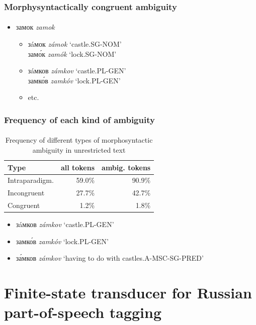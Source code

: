 \documentclass{beamer}
\newcommand{\rus}[1]{\foreignlanguage{russian}{#1}}
\begin{document}
\begin{frame}
\frametitle{Morphysyntactically congruent ambiguity}
\framesubtitle{}
\begin{itemize}
	\item \rus{замок} \emph{zamok}
	\begin{itemize}
		\item \rus{з\'{a}мок} \emph{z\'{a}mok} `castle.SG-NOM'\\
			  \rus{зам\'{о}к} \emph{zam\'{o}k} `lock.SG-NOM'
		\item \rus{з\'{a}мков} \emph{z\'{a}mkov} `castle.PL-GEN'\\
			  \rus{замк\'{о}в} \emph{zamk\'{o}v} `lock.PL-GEN'
		\item etc.
	\end{itemize}
\end{itemize}
\end{frame}

\begin{frame}
\frametitle{Frequency of each kind of ambiguity}
\framesubtitle{}
\begin{table}
  \centering
  \begin{tabular}{l|rr}
    \hline
    \textbf{Type}  & \textbf{all tokens} & \textbf{ambig. tokens} \\
    \hline
    Intraparadigm. & 59.0\%                   & 90.9\%   \\
    Incongruent    & 27.7\%                   & 42.7\%   \\ 
    Congruent      & 1.2\%                   & 1.8\%    \\ 
    \hline
  \end{tabular}
  \caption{Frequency of different types of morphosyntactic ambiguity in unrestricted text}
  \label{table:ambiguity}
\end{table}
\begin{itemize}
	\item \rus{з\'{a}мков} \emph{zámkov} `castle.PL-GEN'
	\item \rus{замк\'{о}в} \emph{zamkóv} `lock.PL-GEN'
	\item \rus{з\'{а}мков} \emph{zámkov} `having to do with castles.A-MSC-SG-PRED'
\end{itemize}
\end{frame}

\section{Finite-state transducer for Russian part-of-speech tagging} %
\end{document}
